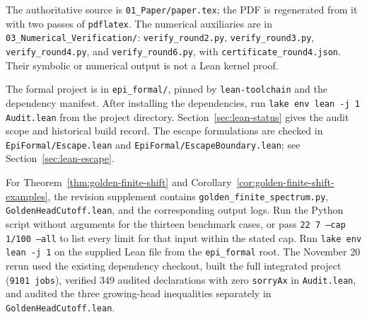 \documentclass[11pt]{amsart}
\theoremstyle{definition}
\theoremstyle{remark}
\numberwithin{equation}{section}
\begin{document}
The authoritative source is \texttt{01\_\allowbreak{}Paper/\allowbreak{}paper.tex}; the PDF is regenerated from it with two passes of \texttt{pdflatex}. The numerical auxiliaries are in \texttt{03\_\allowbreak{}Numerical\_\allowbreak{}Verification/\allowbreak{}}: \texttt{verify\_\allowbreak{}round2.py}, \texttt{verify\_\allowbreak{}round3.py}, \texttt{verify\_\allowbreak{}round4.py}, and \texttt{verify\_\allowbreak{}round6.py}, with \texttt{certificate\_\allowbreak{}round4.json}. Their symbolic or numerical output is not a Lean kernel proof.

The formal project is in \texttt{epi\_formal/}, pinned by
\texttt{lean-toolchain} and the dependency manifest. After installing the
dependencies, run \texttt{lake env lean -j 1 Audit.lean} from the project
directory. Section~\ref{sec:lean-status} gives the audit scope and
historical build record. The escape formulations are checked in
\texttt{EpiFormal/\allowbreak Escape.lean} and
\texttt{EpiFormal/\allowbreak EscapeBoundary.lean}; see
Section~\ref{sec:lean-escape}.

For Theorem~\ref{thm:golden-finite-shift} and Corollary~\ref{cor:golden-finite-shift-examples}, the revision supplement contains
\texttt{golden\_\allowbreak{}finite\_\allowbreak{}spectrum.py},
\texttt{GoldenHeadCutoff.lean}, and the corresponding output logs.
Run the Python script without arguments for the thirteen benchmark cases,
or pass \texttt{22 7 --cap 1/100 --all} to list every limit for that input
within the stated cap. Run
\texttt{lake env lean -j 1} on the supplied Lean file from the
\texttt{epi\_formal} root. The November 20 rerun used the existing
dependency checkout, built the full integrated project (\texttt{9101 jobs}),
verified 349 audited declarations with zero \texttt{sorryAx} in
\texttt{Audit.lean}, and audited the three growing-head inequalities
separately in \texttt{GoldenHeadCutoff.lean}.
\end{document}
